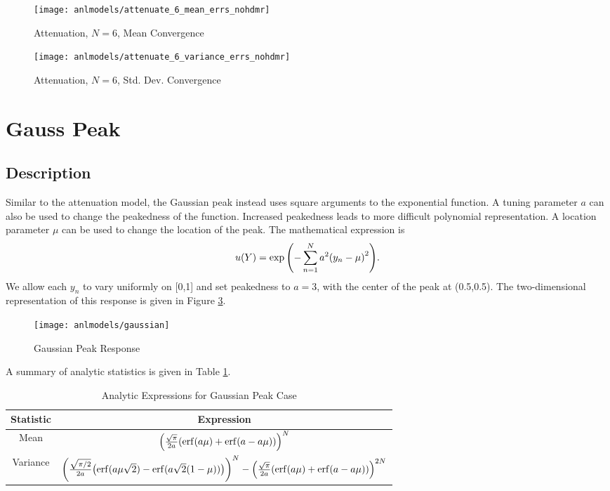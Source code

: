\begin{figure}[H]
  \centering
  \texttt{[image: anlmodels/attenuate\_6\_mean\_errs\_nohdmr]}
  \caption{Attenuation, $N=6$, Mean Convergence}
  \label{fig:attenuate mean errors 6}
\end{figure}
\begin{figure}[H]
  \centering
  \texttt{[image: anlmodels/attenuate\_6\_variance\_errs\_nohdmr]}
  \caption{Attenuation, $N=6$, Std. Dev. Convergence}
  \label{fig:attenuate var errors 6}
\end{figure}


\section{Gauss Peak}
\subsection{Description}\label{mod:gausspeak}
Similar to the attenuation model, the Gaussian peak \cite{sfugenz} instead uses square arguments to the
exponential function.  A tuning parameter $a$ can also be used to change the peakedness of the
function.  Increased peakedness leads to more difficult polynomial representation.
A location parameter $\mu$ can be used to change the location of the peak.
The mathematical expression is
\begin{equation}
  u(Y) = \exp\qty(-\sum_{n=1}^N a^2\qty(y_n-\mu)^2).
\end{equation}
We allow each $y_n$ to vary uniformly on [0,1] and set peakedness to $a=3$, with the center
of the peak at (0.5,0.5).
The two-dimensional representation of this response is given in Figure \ref{fig: gauss peak}.
\begin{figure}[htb]
  \centering
  \texttt{[image: anlmodels/gaussian]}
  \caption{Gaussian Peak Response \cite{sfu}}
  \label{fig: gauss peak}
\end{figure}
A summary of analytic statistics is given in Table \ref{tab:gausspeak moments}.

\begin{table}[H]
  \centering
  \begin{tabular}{c|c}
    Statistic & Expression \\ \hline
    Mean & $\qty(\frac{\sqrt{\pi}}{2a}\qty(\erf(a\mu)+\erf(a-a\mu)))^N$ \\
    Variance & $\qty(\frac{\sqrt{\pi/2}}{2a}\qty(\erf(a\mu\sqrt{2})-\erf(a\sqrt{2}(1-\mu))))^N - 
        \qty(\frac{\sqrt{\pi}}{2a}\qty(\erf(a\mu)+\erf(a-a\mu)))^{2N}$
  \end{tabular}
  \caption{Analytic Expressions for Gaussian Peak Case}
  \label{tab:gausspeak moments}
\end{table}
